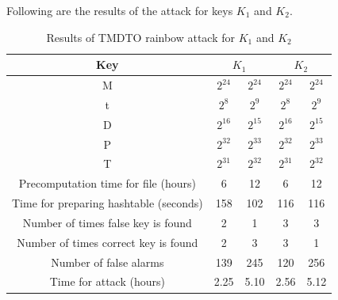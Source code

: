 Following are the results of the attack for keys $K_1$ and $K_2$. 

\begin{table}[ht!]
\begin{center}
\begin{tabular}{|c||c|c||c|c|}
\hline
Key & \multicolumn{2}{c||}{\textbf{$K_1$}} & \multicolumn{2}{c|}{\textbf{$K_2$}} \\ \hline \hline
M																				&	$2^{24}$ 	&	$2^{24}$ 	&	$2^{24}$ 	&	$2^{24}$ 	\\ 
t	  																		&	$2^{8}$ 	&	$2^{9}$ 	&	$2^{8}$ 	&	$2^{9}$		\\ 
D	  																		&	$2^{16}$ 	&	$2^{15}$ 	&	$2^{16}$ 	&	$2^{15}$	\\ \hline \hline
P	  																		&	$2^{32}$ 	&	$2^{33}$ 	&	$2^{32}$ 	&	$2^{33}$	\\ 
T	  																		&	$2^{31}$ 	&	$2^{32}$ 	&	$2^{31}$ 	&	$2^{32}$	\\ \hline \hline
Precomputation time for file (hours)		&	6 	 			&	12 				&	6					&	12 				\\ \hline
Time for preparing hashtable (seconds)	&	158				&	102				& 116				&	116				\\ \hline
Number of times false key is found			&	2 				&	1 				&	3 				&	3 				\\ \hline
Number of times correct key is found 		&	2 				&	3					&	3 				&	1 				\\ \hline
Number of false alarms									&	139				&	245				&	120				&	256				\\ \hline
Time for attack	(hours)									&	2.25 			&	5.10			&	2.56 		 	&	5.12 			\\ \hline
\end{tabular}
\end{center}
\caption{Results of TMDTO rainbow attack for $K_1$ and $K_2$}
\label{tab:rainbow-attack-results}
\end{table}

